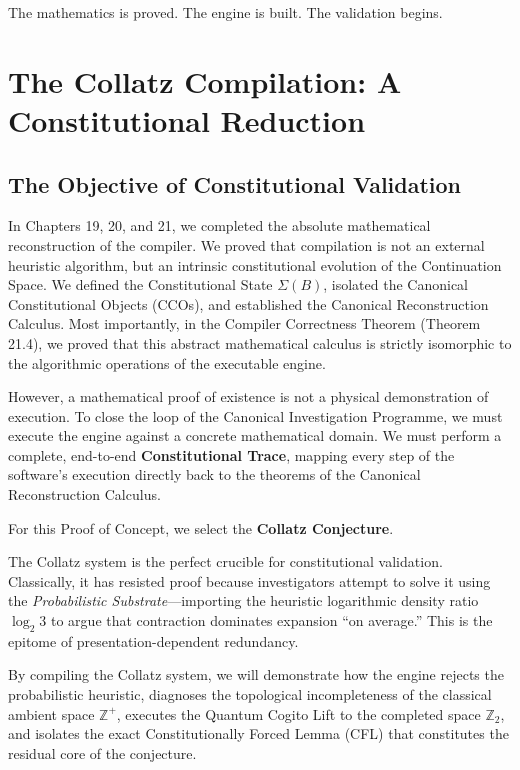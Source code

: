 \documentclass[12pt,openany]{extbook}
\theoremstyle{plain}
\theoremstyle{definition}
\begin{document}
The mathematics is proved. The engine is built. The validation begins.

\chapter{The Collatz Compilation: A Constitutional Reduction}

\section{The Objective of Constitutional Validation}

In Chapters 19, 20, and 21, we completed the absolute mathematical reconstruction of the compiler. We proved that compilation is not an external heuristic algorithm, but an intrinsic constitutional evolution of the Continuation Space. We defined the Constitutional State $\Sigma(B)$, isolated the Canonical Constitutional Objects (CCOs), and established the Canonical Reconstruction Calculus. Most importantly, in the Compiler Correctness Theorem (Theorem 21.4), we proved that this abstract mathematical calculus is strictly isomorphic to the algorithmic operations of the executable engine.

However, a mathematical proof of existence is not a physical demonstration of execution. To close the loop of the Canonical Investigation Programme, we must execute the engine against a concrete mathematical domain. We must perform a complete, end-to-end \textbf{Constitutional Trace}, mapping every step of the software's execution directly back to the theorems of the Canonical Reconstruction Calculus.

For this Proof of Concept, we select the \textbf{Collatz Conjecture}.

The Collatz system is the perfect crucible for constitutional validation. Classically, it has resisted proof because investigators attempt to solve it using the \emph{Probabilistic Substrate}---importing the heuristic logarithmic density ratio $\log_2 3$ to argue that contraction dominates expansion ``on average.'' This is the epitome of presentation-dependent redundancy.

By compiling the Collatz system, we will demonstrate how the engine rejects the probabilistic heuristic, diagnoses the topological incompleteness of the classical ambient space $\mathbb{Z}^+$, executes the Quantum Cogito Lift to the completed space $\mathbb{Z}_2$, and isolates the exact Constitutionally Forced Lemma (CFL) that constitutes the residual core of the conjecture.
\end{document}
